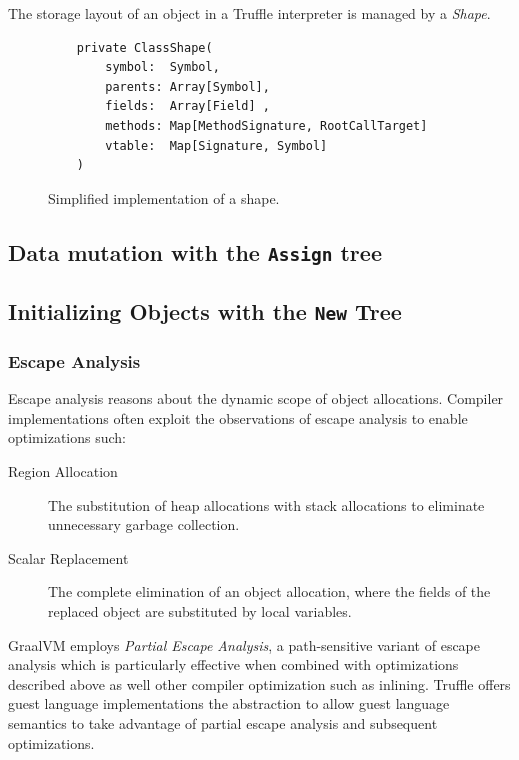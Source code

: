 The storage layout of an object in a Truffle interpreter is managed by a \textit{Shape}.

\begin{figure}[!htb]
	\begin{verbatim}
	private ClassShape(
		symbol:  Symbol,
		parents: Array[Symbol],
		fields:  Array[Field] ,
		methods: Map[MethodSignature, RootCallTarget]
		vtable:  Map[Signature, Symbol]
	)
	\end{verbatim}
	\caption{Simplified implementation of a shape.}
\end{figure}

\subsection{Data mutation with the \texttt{Assign} tree}

\subsection{Initializing Objects with the \texttt{New} Tree}

\subsubsection{Escape Analysis}

Escape analysis\cite{escape-analysis} reasons about the dynamic scope of object allocations. 
Compiler implementations often exploit the observations of escape analysis to enable optimizations such:

\begin{description}
	\item[Region Allocation\cite{java:escape-analysis}\cite{tofte:region-memory}] The substitution of heap allocations with stack allocations to eliminate unnecessary garbage collection.
	\item[Scalar Replacement\cite{java:escape-analysis-optimizations}] The complete elimination of an object allocation, where the fields of the replaced object are substituted by local variables.
\end{description}

GraalVM employs \textit{Partial Escape Analysis}\cite{java:partial-escape-analysis}, a path-sensitive variant of escape analysis which is particularly effective when combined with optimizations described above as well other compiler optimization such as inlining. 
Truffle offers guest language implementations the  abstraction to allow guest language semantics to take advantage of partial escape analysis and subsequent optimizations.


